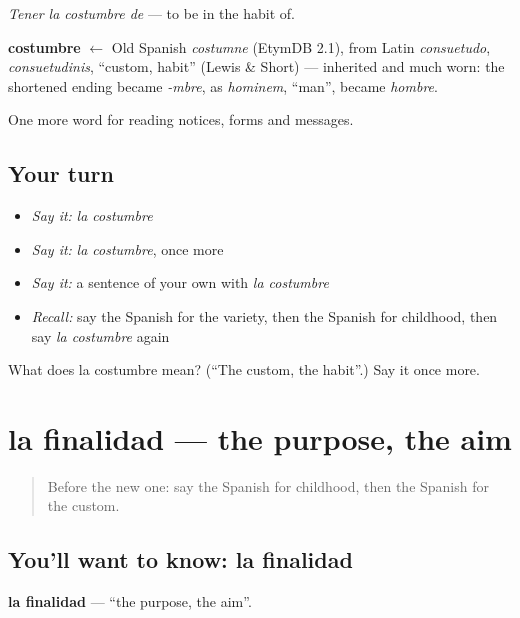 \emph{Tener la costumbre de} — to be in the habit of.

\begin{cousinweb}
\textbf{costumbre} $\leftarrow$ Old Spanish \emph{costumne} (EtymDB 2.1), from Latin \emph{consuetudo}, \emph{consuetudinis}, \textquotedblleft{}custom, habit\textquotedblright{} (Lewis \& Short) — inherited and much worn: the shortened ending became \emph{-mbre}, as \emph{hominem}, \textquotedblleft{}man\textquotedblright{}, became \emph{hombre}.
\end{cousinweb}

\begin{grammarlens}[title={What you've built}]
One more word for reading notices, forms and messages.
\end{grammarlens}

\subsection*{Your turn}
\begin{itemize}
\raggedright
  \item \emph{Say it:} \emph{la costumbre}
  \item \emph{Say it:} \emph{la costumbre}, once more
  \item \emph{Say it:} a sentence of your own with \emph{la costumbre}
  \item \emph{Recall:} say the Spanish for the variety, then the Spanish for childhood, then say \emph{la costumbre} again
\end{itemize}

\begin{tcolorbox}[breakable,colback=teal!4,colframe=teal!35!black,title={Before you move on}]
What does la costumbre mean? (\textquotedblleft{}The custom, the habit\textquotedblright{}.) Say it once more.
\end{tcolorbox}
\section[la finalidad]{la finalidad — the purpose, the aim}

\label{lesson:ES-C483-finalidad}



\begin{quote}
Before the new one: say the Spanish for childhood, then the Spanish for the custom.
\end{quote}

\subsection*{You'll want to know: la finalidad}
\textbf{la finalidad} — \textquotedblleft{}the purpose, the aim\textquotedblright{}.

